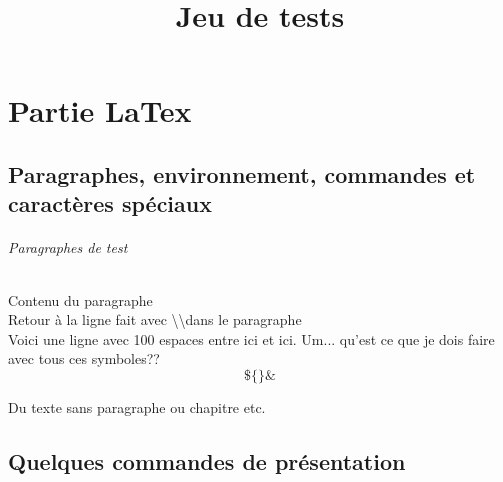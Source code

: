 \documentclass{report}
\title{Jeu de tests}
\begin{document}
\maketitle
\tableofcontents
\part{Partie LaTex}
\chapter{Paragraphes, environnement, commandes et caractères spéciaux}
\paragraph{Paragraphes de test}{Contenu du paragraphe \\Retour à la ligne fait avec \textbackslash \textbackslash dans le paragraphe
\\Voici une ligne avec 100 espaces entre ici                        et ici.}
Um... qu'est ce que je dois faire avec tous ces symboles?? \[\$\{\}\&\]

Du texte sans paragraphe ou chapitre etc.

\chapter{Quelques commandes de présentation}
\end{document}
